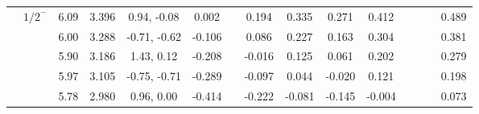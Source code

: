 \documentclass[prd,twocolumn,floatfix,nofootinbib]{revtex4}
\begin{document}
\begin{table*}[!htbp]
\begin{tabular}{cc|ccc|cccccccccc}
            &${1/2}^{-}$    &6.09   &3.396  &0.94, -0.08 &0.002 & &0.194 &0.335 &0.271 &0.412 & & & &0.489 \\
            &               &6.00   &3.288  &-0.71, -0.62 &-0.106 & &0.086 &0.227 &0.163 &0.304 & & & &0.381 \\
            &               &5.90   &3.186  &1.43, 0.12 &-0.208 & &-0.016 &0.125 &0.061 &0.202 & & & &0.279 \\
            &               &5.97   &3.105  &-0.75, -0.71 &-0.289 & &-0.097 &0.044 &-0.020 &0.121 & & & &0.198 \\
            &               &5.78   &2.980  &0.96, 0.00 &-0.414 & &-0.222 &-0.081 &-0.145 &-0.004 & & & &0.073 \\   
        \bottomrule[0.5pt]\bottomrule[1.5pt]
    \end{tabular}
\end{table*}
\end{document}
